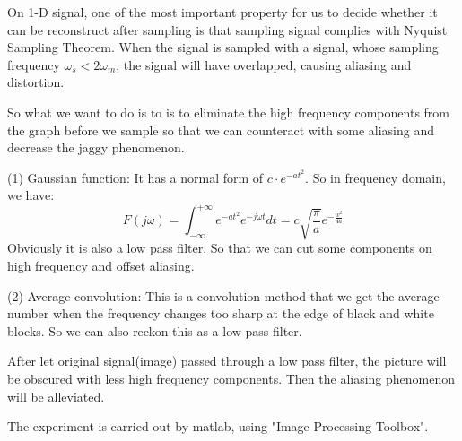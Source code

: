 \documentclass[12pt,a4paper]{article}
\begin{document}
On 1-D signal, one of the most important property for us to decide whether it can be reconstruct 
after sampling is that sampling signal complies with Nyquist Sampling Theorem. When the signal is 
sampled with a signal, whose sampling frequency $\omega_s<2\omega_m$, the signal will have overlapped,
causing aliasing and distortion.
\begin{figure}[H]
\centering{}
\end{figure}
So what we want to do is to is to eliminate the high frequency components from the graph before 
we sample so that we can counteract with some aliasing and decrease the jaggy phenomenon.\par
(1) Gaussian function: It has a normal form of $c\cdot e^{-at^2}$. So in frequency domain, we have:
\[
    \displaystyle F(j\omega)=\int_{-\infty}^{+\infty}e^{-at^2}e^{-j\omega t}dt=c\sqrt{\frac{\pi}{a}}e^{-\frac{w^2}{4a}}
\]
Obviously it is also a low pass filter. So that we can cut some components on high frequency and offset aliasing.\par
(2) Average convolution: This is a convolution method that we get the average number when the frequency changes too sharp 
at the edge of black and white blocks. So we can also reckon this as a low pass filter.\par
After let original signal(image) passed through a low pass filter, the picture will be obscured with less high frequency components.
Then the aliasing phenomenon will be alleviated.
\par
The experiment is carried out by matlab, using "Image Processing Toolbox".
\end{document}
